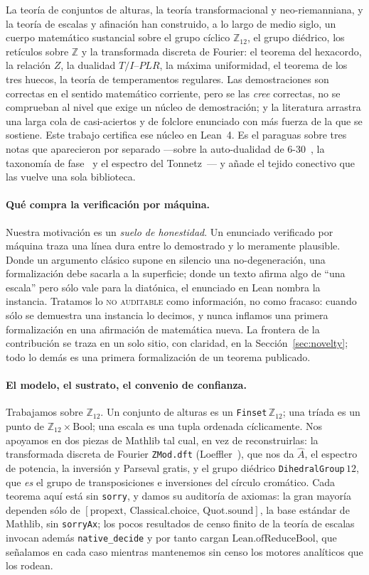 \documentclass[11pt]{article}
\newcommand{\lean}[1]{\texttt{#1}}
\newcommand{\Ztwelve}{\mathbb{Z}_{12}}
\newcommand{\Ahat}{\hat{A}}
\begin{document}
La teoría de conjuntos de alturas, la teoría transformacional y neo-riemanniana, y la teoría de escalas y
afinación han construido, a lo largo de medio siglo, un cuerpo matemático sustancial sobre el grupo
cíclico $\Ztwelve$, el grupo diédrico, los retículos sobre $\mathbb{Z}$ y la transformada discreta de
Fourier: el teorema del hexacordo, la relación $Z$, la dualidad $T/I$--$PLR$, la máxima uniformidad, el
teorema de los tres huecos, la teoría de temperamentos regulares. Las demostraciones son correctas en el
sentido matemático corriente, pero se las \emph{cree} correctas, no se comprueban al nivel que exige un
núcleo de demostración; y la literatura arrastra una larga cola de casi-aciertos y de folclore enunciado
con más fuerza de la que se sostiene. Este trabajo certifica ese núcleo en Lean~4. Es el paraguas sobre
tres notas que aparecieron por separado ---sobre la auto-dualidad de 6-30~\cite{Note1}, la taxonomía de
fase~\cite{Note2} y el espectro del Tonnetz~\cite{Note3}--- y añade el tejido conectivo que las vuelve una
sola biblioteca.

\paragraph{Qué compra la verificación por máquina.} Nuestra motivación es un \emph{suelo de honestidad}.
Un enunciado verificado por máquina traza una línea dura entre lo demostrado y lo meramente plausible.
Donde un argumento clásico supone en silencio una no-degeneración, una formalización debe sacarla a la
superficie; donde un texto afirma algo de ``una escala'' pero sólo vale para la diatónica, el enunciado en
Lean nombra la instancia. Tratamos lo \textsc{no auditable} como información, no como fracaso: cuando sólo
se demuestra una instancia lo decimos, y nunca inflamos una primera formalización en una afirmación de
matemática nueva. La frontera de la contribución se traza en un solo sitio, con claridad, en la
Sección~\ref{sec:novelty}; todo lo demás es una primera formalización de un teorema publicado.

\paragraph{El modelo, el sustrato, el convenio de confianza.} Trabajamos sobre $\Ztwelve$. Un conjunto de
alturas es un \lean{Finset}\,$\Ztwelve$; una tríada es un punto de $\Ztwelve\times\mathrm{Bool}$; una
escala es una tupla ordenada cíclicamente. Nos apoyamos en dos piezas de Mathlib tal cual, en vez de
reconstruirlas: la transformada discreta de Fourier \lean{ZMod.dft} (Loeffler~\cite{Loeffler}), que nos da
$\Ahat$, el espectro de potencia, la inversión y Parseval gratis, y el grupo diédrico
\lean{DihedralGroup}\,$12$, que \emph{es} el grupo de transposiciones e inversiones del círculo cromático.
Cada teorema aquí está sin \lean{sorry}, y damos su auditoría de axiomas: la gran mayoría dependen sólo de
$[\mathrm{propext},\,\mathrm{Classical.choice},\,\mathrm{Quot.sound}]$, la base estándar de Mathlib, sin
\lean{sorryAx}; los pocos resultados de censo finito de la teoría de escalas invocan además
\lean{native\_decide} y por tanto cargan $\mathrm{Lean.ofReduceBool}$, que señalamos en cada caso mientras
mantenemos sin censo los motores analíticos que los rodean.
\end{document}
